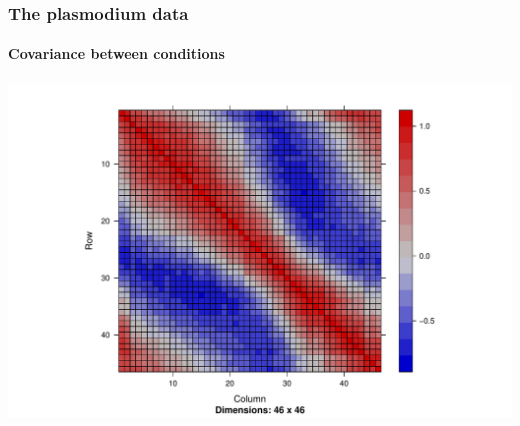 \begin{frame}[fragile]
\frametitle{The plasmodium data}
\framesubtitle{Covariance between conditions}

\begin{knitrout}\scriptsize
{}\color{fgcolor}\begin{kframe}
\begin{alltt}
\hlstd{(}\hlstd{(}
\end{alltt}
\end{kframe}
\includegraphics[width=.8\textwidth]{figures/get_plasmodium_data_fig_cond-1} 

\end{knitrout}
\end{frame}

